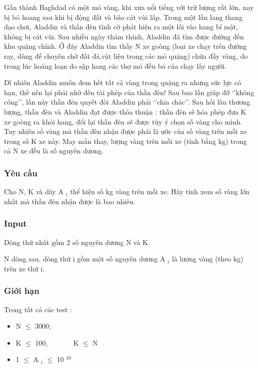

Gần thành Baghdad có một mỏ vàng, khi xưa nổi tiếng với trữ lượng rất lớn, nay bị bỏ hoang sau khi bị động đất và bão cát vùi lấp. Trong một lần lang thang dạo chơi, Aladdin và thần đèn tình cờ phát hiện ra một lối vào hang bí mật, không bị cát vùi. Sau nhiều ngày thám thính, Aladdin đã tìm được đường đến khu quặng chính. Ở đây Aladdin tìm thấy N xe goòng (loại xe chạy trên đường ray, dùng để chuyên chở đất đá,vật liệu trong các mỏ quặng) chứa đầy vàng, do trong lúc hoảng loạn do sập hang các thợ mỏ đều bỏ của chạy lấy người.

Dĩ nhiên Aladdin muốn đem hết tất cả vàng trong quặng ra nhưng sức lực có hạn, thế nên lại phải nhờ đến tài phép của thần đèn! Sau bao lần giúp đỡ ‘’không công’’, lần này thần đèn quyết đòi Aladdin phải ‘’chia chác’’. Sau hồi lâu thương lượng, thần đèn và Aladdin đạt được thỏa thuận : thần đèn sẽ hóa phép đưa K xe goòng ra khỏi hang, đổi lại thần đèn sẽ được tùy ý chọn số vàng cho mình. Tuy nhiên số vàng mà thần đèn nhận được phải là ước của số vàng trên mỗi xe trong số K xe này. May mắn thay, lượng vàng trên mỗi xe (tính bằng kg) trong cả N xe đều là số nguyên dương.

\subsubsection{Yêu cầu}

Cho N, K và dãy A $_ i $ thể hiện số kg vàng trên mỗi xe. Hãy tính xem số vàng lớn nhất mà thần đèn nhận được là bao nhiêu.

\subsubsection{Input}

Dòng thứ nhất gồm 2 số nguyên dương N và K.

N dòng sau, dòng thứ i gồm một số nguyên dương A $_ i $ là lượng vàng (theo kg) trên xe thứ i.

\subsubsection{Giới hạn}

Trong tất cả các test :
\begin{itemize}
	\item N  $\le$  3000;
	\item K  $\le$  100,        K  $\le$  N
	\item 1  $\le$  A $_ i $  $\le$  10 $^ 10 $
\end{itemize}

